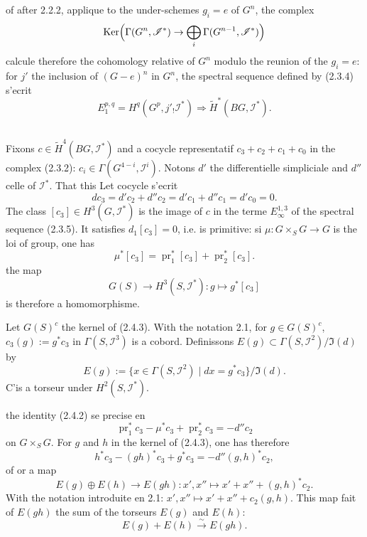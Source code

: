 \documentclass[11pt,a4paper]{article}
\theoremstyle{plain}
\theoremstyle{definition}
\DeclareMathOperator{\Ker}{Ker}
\DeclareMathOperator{\pr}{pr}
\begin{document}
of after 2.2.2, applique to the under-schemes $g_i = e$ of $G^n$, the complex
\[
\Ker\Bigl(\Gamma(G^n, \mathscr{I}^*) \to \bigoplus_i \Gamma(G^{n-1}, \mathscr{I}^*)\Bigr)
\]
calcule therefore the cohomology relative of $G^n$ modulo the reunion of the $g_i = e$: for $j'$ the inclusion of $(G - e)^n$ in $G^n$, the spectral sequence defined by (2.3.4) s'ecrit
\begin{equation}\label{2.3.7}
E_1^{p,q} = H^q(G^p, j'_! \mathscr{I}^*) \Rightarrow \widetilde{H}^*(BG, \mathscr{I}^*).
\end{equation}

\subsection{}\label{2.4}

Fixons $c \in \widetilde{H}^4(BG, \mathscr{I}^*)$ and a cocycle representatif $c_3 + c_2 + c_1 + c_0$ in the complex (2.3.2): $c_i \in \Gamma(G^{4-i}, \mathscr{I}^i)$. Notons $d'$ the differentielle simpliciale and $d''$ celle of $\mathscr{I}^*$. That this Let cocycle s'ecrit
\begin{equation}\label{2.4.1}
d c_3 = d'c_2 + d''c_2 = d'c_1 + d''c_1 = d'c_0 = 0.
\end{equation}
The class $[c_3] \in H^3(G, \mathscr{I}^*)$ is the image of $c$ in the terme $E_\infty^{1,3}$ of the spectral sequence (2.3.5). It satisfies $d_1[c_3] = 0$, i.e. is primitive: si $\mu : G \times_S G \to G$ is the loi of group, one has
\begin{equation}\label{2.4.2}
\mu^*[c_3] = \pr_1^*[c_3] + \pr_2^*[c_3].
\end{equation}
the map
\begin{equation}\label{2.4.3}
G(S) \to H^3(S, \mathscr{I}^*) : g \mapsto g^*[c_3]
\end{equation}
is therefore a homomorphisme.

Let $G(S)^c$ the kernel of (2.4.3). With the notation 2.1, for $g \in G(S)^c$, $c_3(g) := g^* c_3$ in $\Gamma(S, \mathscr{I}^3)$ is a cobord. Definissons $E(g) \subset \Gamma(S, \mathscr{I}^2)/\Im(d)$ by
\begin{equation}\label{2.4.4}
E(g) := \{x \in \Gamma(S, \mathscr{I}^2) \mid dx = g^* c_3\}/\Im(d).
\end{equation}
C'is a torseur under $H^2(S, \mathscr{I}^*)$.

the identity (2.4.2) se precise en
\[
\pr_1^* c_3 - \mu^* c_3 + \pr_2^* c_3 = -d'' c_2
\]
on $G \times_S G$. For $g$ and $h$ in the kernel of (2.4.3), one has therefore
\[
h^* c_3 - (gh)^* c_3 + g^* c_3 = -d'' (g, h)^* c_2,
\]
of or a map
\begin{equation}\label{2.4.5}
E(g) \oplus E(h) \to E(gh) : x', x'' \mapsto x' + x'' + (g, h)^* c_2.
\end{equation}
With the notation introduite en 2.1: $x', x'' \mapsto x' + x'' + c_2(g, h)$. This map fait of $E(gh)$ the sum of the torseurs $E(g)$ and $E(h)$:
\begin{equation}\label{2.4.6}
E(g) + E(h) \xrightarrow{\sim} E(gh).
\end{equation}
\end{document}
